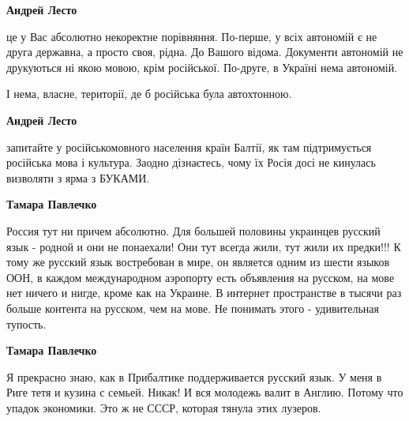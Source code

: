 \begin{itemize}
\begin{itemize}
 
\textbf{Андрей Лесто} 

це у Вас абсолютно некоректне порівняння. По-перше, у всіх автономій є не друга
державна, а просто своя, рідна. До Вашого відома. Документи автономій не
друкуються ні якою мовою, крім російської. По-друге, в Україні нема автономій.

І нема, власне, території, де б російська була автохтонною.

 
\textbf{Андрей Лесто} 

запитайте у російськомовного населення країн Балтії, як там підтримується
російська мова і культура. Заодно дізнаєтесь, чому їх Росія досі не кинулась
визволяти з ярма з БУКАМИ.


 
\textbf{Тамара Павлечко} 

Россия тут ни причем абсолютно. Для большей половины украинцев русский язык -
родной и они не понаехали! Они тут всегда жили, тут жили их предки!!! К тому же
русский язык востребован в мире, он является одним из шести языков ООН, в
каждом международном аэропорту есть объявления на русском, на мове нет ничего и
нигде, кроме как на Украине. В интернет пространстве в тысячи раз больше
контента на русском, чем на мове. Не понимать этого - удивительная тупость.

 
\textbf{Тамара Павлечко} 

Я прекрасно знаю, как в Прибалтике поддерживается русский язык. У меня в Риге
тетя и кузина с семьей. Никак! И вся молодежь валит в Англию. Потому что упадок
экономики. Это ж не СССР, которая тянула этих лузеров.



\end{itemize}
\end{itemize}
